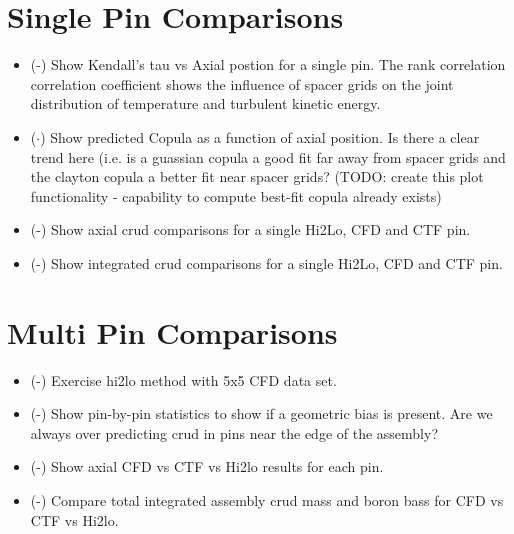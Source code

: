 
\section{Single Pin Comparisons}

\begin{itemize}
    \item (\checkmark-) Show Kendall's tau vs Axial postion for a single pin.  The rank correlation correlation coefficient shows
    the influence of spacer grids on the joint distribution of temperature and turbulent kinetic energy.
    \item ($\cdot$) Show predicted Copula as a function of axial position.  Is there a clear trend here (i.e. is a guassian copula
        a good fit far away from spacer grids and the clayton copula a better fit near spacer grids?  (TODO: create this plot functionality - capability to compute best-fit copula already exists)
    \item (\checkmark-) Show axial crud comparisons for a single Hi2Lo, CFD and CTF pin.
    \item (\checkmark-) Show integrated crud comparisons for a single Hi2Lo, CFD and CTF pin.
\end{itemize}

\section{Multi Pin Comparisons}

\begin{itemize}
    \item (\checkmark-) Exercise hi2lo method with 5x5 CFD data set.
    \item (\checkmark-) Show pin-by-pin statistics to show if a geometric bias is present.  Are we always over predicting crud
    in pins near the edge of the assembly?
    \item (\checkmark-) Show axial CFD vs CTF vs Hi2lo results for each pin.
    \item (\checkmark-) Compare total integrated assembly crud mass and boron bass for CFD vs CTF vs Hi2lo.
\end{itemize}
